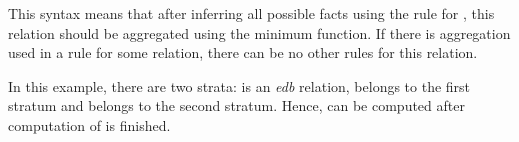 This syntax means that after inferring all possible facts using the rule for , this relation should be aggregated using the minimum function. If there is aggregation used in a rule for some relation, there can be no other rules for this relation.

In this example, there are two strata:  is an \emph{edb} relation,  belongs to the first stratum and  belongs to the second stratum. Hence,  can be computed after computation of  is finished.


